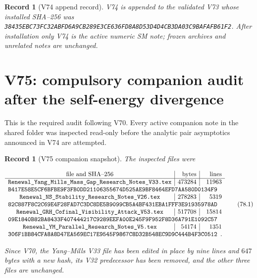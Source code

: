 \documentclass[11pt]{article}
\newtheorem{record}[theorem]{Record}
\theoremstyle{remark}
\begin{document}
\begin{record}[V74 append record]
\label{rec:v19v74}
V74 is appended to the validated V73 whose installed SHA--256 was
\texttt{38435EBC73FC32ABFD6A9CB289E3CE636FD8A8D53D4D4CB3DA03C9BAFAFB61F2}.
After installation only V74 is the active numeric SM note; frozen
archives and unrelated notes are unchanged.
\end{record}


\section{V75: compulsory companion audit after the self-energy divergence}
\label{sec:v19v75}

This is the required audit following V70.  Every active companion note
in the shared folder was inspected read-only before the analytic pair
asymptotics announced in V74 are attempted.

\begin{record}[V75 companion snapshot]
\label{rec:v19v75-snapshot}
The inspected files were

\[
\begin{array}{c|r|r}
\hbox{file and SHA--256}&\hbox{bytes}&\hbox{lines}\\ \hline
\texttt{Renewal\_Yang\_Mills\_Mass\_Gap\_Research\_Notes\_V33.tex}
&473284&11963\\
\multicolumn{3}{l}{
\texttt{B417E58E5CF6BFBE9F3FB0DD21106355674D525AE9BF8464EFD7AA580D0134F9}}
\\
\texttt{Renewal\_NS\_Stability\_Research\_Notes\_V26.tex}
&278283&5319\\
\multicolumn{3}{l}{
\texttt{82C887F8C2C69E4F28FAD7C3DC8DE5B9099CB5A4BF431EBA1FFF3E91935978AD}}
\\
\texttt{Renewal\_GRH\_Cofinal\_Visibility\_Attack\_V53.tex}
&517708&15814\\
\multicolumn{3}{l}{
\texttt{09E1840B82BA8433F407444217C9289EEFA00E245F9F952F8D36A791E1092C57}}
\\
\texttt{Renewal\_YM\_Parallel\_Research\_Notes\_V5.tex}
&54174&1351\\
\multicolumn{3}{l}{
\texttt{306F1BB84CFA8A8D47EA569EC17E9545F9867C8D32B548EC9D9C444B4F3C0512}}.
\end{array}                                                     \tag{78.1}
\]

Since V70, the Yang--Mills V33 file has been edited in place by nine
lines and \(647\) bytes with a new hash, its V32 predecessor has been
removed, and the other three files are unchanged.
\end{record}
\end{document}
